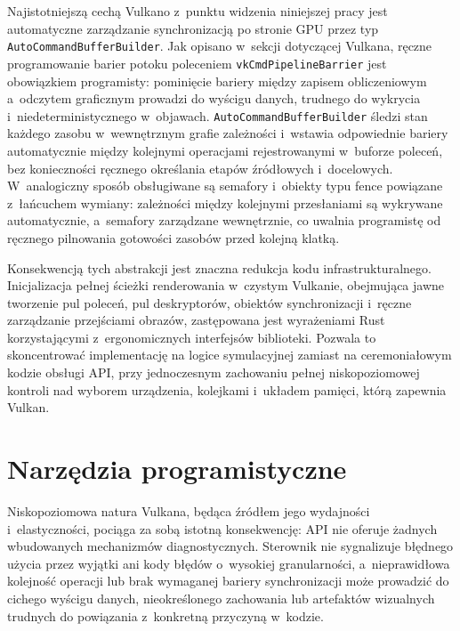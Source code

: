 Najistotniejszą cechą Vulkano z~punktu widzenia niniejszej pracy jest automatyczne
zarządzanie synchronizacją po stronie GPU przez typ \texttt{AutoCommandBufferBuilder}.
Jak opisano w~sekcji dotyczącej Vulkana, ręczne programowanie barier potoku poleceniem
\texttt{vkCmdPipelineBarrier} jest obowiązkiem programisty: pominięcie bariery między
zapisem obliczeniowym a~odczytem graficznym prowadzi do wyścigu danych,
trudnego do wykrycia i~niedeterministycznego w~objawach.
\texttt{AutoCommandBufferBuilder} śledzi stan każdego zasobu w~wewnętrznym grafie zależności
i~wstawia odpowiednie bariery automatycznie między kolejnymi operacjami rejestrowanymi
w~buforze poleceń, bez konieczności ręcznego określania etapów źródłowych i~docelowych.
W~analogiczny sposób obsługiwane są semafory i~obiekty typu fence powiązane z~łańcuchem wymiany:
zależności między kolejnymi przesłaniami są wykrywane automatycznie, a~semafory zarządzane
wewnętrznie, co uwalnia programistę od ręcznego pilnowania gotowości zasobów przed
kolejną klatką.

Konsekwencją tych abstrakcji jest znaczna redukcja kodu infrastrukturalnego. Inicjalizacja
pełnej ścieżki renderowania w~czystym Vulkanie, obejmująca jawne tworzenie pul poleceń,
pul deskryptorów, obiektów synchronizacji i~ręczne zarządzanie przejściami obrazów,
zastępowana jest wyrażeniami Rust korzystającymi z~ergonomicznych interfejsów biblioteki.
Pozwala to skoncentrować implementację na logice symulacyjnej zamiast na ceremoniałowym
kodzie obsługi API, przy jednoczesnym zachowaniu pełnej niskopoziomowej kontroli nad
wyborem urządzenia, kolejkami i~układem pamięci, którą zapewnia Vulkan.


\section{Narzędzia programistyczne}
\label{sec:dev_tools}

Niskopoziomowa natura Vulkana, będąca źródłem jego wydajności i~elastyczności,
pociąga za sobą istotną konsekwencję: API nie oferuje żadnych wbudowanych mechanizmów
diagnostycznych. Sterownik nie sygnalizuje błędnego użycia przez wyjątki ani kody błędów
o~wysokiej granularności, a~nieprawidłowa kolejność operacji lub brak wymaganej bariery
synchronizacji może prowadzić do cichego wyścigu danych, nieokreślonego zachowania lub
artefaktów wizualnych trudnych do powiązania z~konkretną przyczyną w~kodzie.

